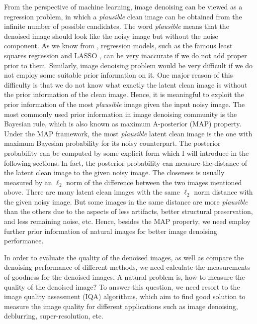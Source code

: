 From the perspective of machine learning, image denoising can be viewed as a regression problem, in which a \textsl{plausible} clean image can be obtained from the infinite number of possible candidates. The word \textsl{plausible} means that the denoised image should look like the noisy image but without the noise component. As we know from \cite{Bishop}, regression models, such as the famous least squares regression and LASSO \cite{lasso}, can be very inaccurate if we do not add proper prior to them. Similarly, image denoising problem would be very difficult if we do not employ some suitable prior information on it. One major reason of this difficulty is that we do not know what exactly the latent clean image is without the prior information of the clean image. Hence, it is meaningful to exploit the prior information of the most \textsl{plausible} image given the input noisy image. The most commonly used prior information in image denoising community is the Bayesian rule, which is also known as maximum A-posterior (MAP) property. Under the MAP framework, the most \textsl{plausible} latent clean image is the one with maximum Bayesian probability for its noisy counterpart. The posterior probability can be computed by some explicit form which I will introduce in the following sections. In fact, the posterior probability can measure the distance of the latent clean image to the given noisy image. The closeness is usually measured by an $\ell_{2}$ norm of the difference between the two images mentioned above. There are many latent clean images with the same $\ell_{2}$ norm distance with the given noisy image. But some images in the same distance are more \textsl{plausible} than the others due to the aspects of less artifacts, better structural preservation, and less remaining noise, etc. Hence, besides the MAP property, we need employ further prior information of natural images for better image denoising performance.


In order to evaluate the quality of the denoised images, as well as compare the denoising performance of different methods, we need calculate the measurements of goodness for the denoised images. A natural problem is, how to measure the quality of the denoised image? To answer this question, we need resort to the image quality assessment (IQA) algorithms, which aim to find good solution to measure the image quality for different applications such as image denoising, deblurring, super-resolution, etc. 

